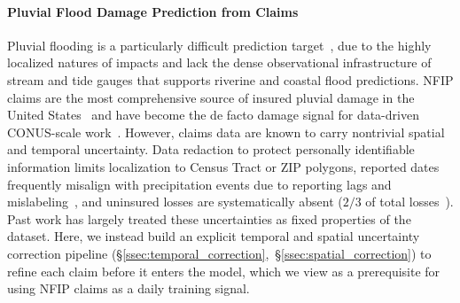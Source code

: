 \paragraph{Pluvial Flood Damage Prediction from Claims}
Pluvial flooding is a particularly difficult prediction target~\cite{rosenzweig_pluvial_2018,nelson-mercer_pluvial_2025}, due to the highly localized natures of impacts and lack the dense observational infrastructure of stream and tide gauges that supports riverine and coastal flood predictions.
%
NFIP claims are the most comprehensive source of insured pluvial damage in the United States~\cite{fema_nfip_claims_v2} and have become the de facto damage signal for data-driven CONUS-scale work~\cite{yang_predicting_2022,garcia_reconstructing_2025}.
%
However, claims data are known to carry nontrivial spatial and temporal uncertainty.
%
Data redaction to protect personally identifiable information limits localization to Census Tract or ZIP polygons, reported dates frequently misalign with precipitation events due to reporting lags and mislabeling~\cite{wing_new_2020,shin_systematic_2022,petkov_learning_2025},
and uninsured losses are systematically absent (\tsim$2/3$ of total losses~\cite{amornsiripanitch2024flood}).
%
Past work has largely treated these uncertainties as fixed properties of the dataset. 
%
Here, we instead build an explicit temporal and spatial uncertainty correction pipeline (\S\ref{ssec:temporal_correction},~\S\ref{ssec:spatial_correction}) to refine each claim before it enters the model, which we view as a prerequisite for using NFIP claims as a daily training signal.


